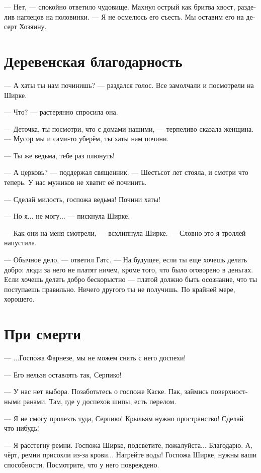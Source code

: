 \documentclass[a4paper,12pt,fleqn]{book}\usepackage{polyglossia}\setdefaultlanguage[babelshorthands=true]{russian}\setotherlanguage{english}\defaultfontfeatures{Ligatures=TeX,Mapping=tex-text}\usepackage{xcolor}\newcommand{\ml}[3]{#2}
\newcommand{\asterism}{\vspace{1em}{\centering\Large\bfseries$\ast~\ast~\ast$\par}\vspace{1em}}
\begin{document}
--- Нет, --- спокойно ответило чудовище.
Махнул острый как бритва хвост, разделив наглецов на половинки.
--- Я не осмелюсь его съесть.
Мы оставим его на десерт Хозяину.

\section{Деревенская благодарность}

--- А хаты ты нам починишь? --- раздался голос. 
Все замолчали и посмотрели на Ширке.

--- Что? --- растерянно спросила она.

--- Деточка, ты посмотри, что с домами нашими, --- терпеливо сказала женщина.
--- Мусор мы и сами-то уберём, ты хаты нам почини.

--- Ты же ведьма, тебе раз плюнуть!

--- А церковь? --- поддержал священник. --- Шестьсот лет стояла, и смотри что теперь.
У нас мужиков не хватит её починить.

--- Сделай милость, госпожа ведьма!
Почини хаты!

--- Но я... не могу... --- пискнула Ширке.

\asterism

--- Как они на меня смотрели, --- всхлипнула Ширке.
--- Словно это я троллей напустила.

--- Обычное дело, --- ответил Гатс.
--- На будущее, если ты еще хочешь делать добро: люди за него не платят ничем, кроме того, что было оговорено в деньгах.
Если хочешь делать добро бескорыстно --- платой должно быть осознание, что ты поступаешь правильно.
Ничего другого ты не получишь.
По крайней мере, хорошего.

\section{При смерти}

--- ...Госпожа Фарнезе, мы не можем снять с него доспехи!

--- Его нельзя оставлять так, Серпико!

--- У нас нет выбора.
Позаботьтесь о госпоже Каске.
Пак, займись поверхностными ранами.
Там, где у доспехов шипы, есть перелом.

--- Я не смогу пролезть туда, Серпико!
Крыльям нужно пространство!
Сделай что-нибудь!

--- Я расстегну ремни.
Госпожа Ширке, подсветите, пожалуйста...
Благодарю.
А, чёрт, ремни присохли из-за крови...
Нагрейте воды!
Госпожа Ширке, нужны ваши способности.
Посмотрите, что у него повреждено.
\end{document}
